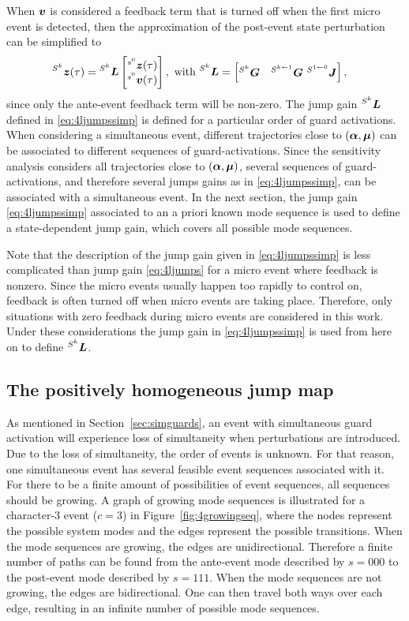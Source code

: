 \documentclass[../DC2017114Bouma.tex]{subfiles}
\begin{document}
When ${\boldsymbol{v}}$ is considered a feedback term that is turned off when the first micro event is detected, then the approximation of the post-event state perturbation can be simplified to
\begin{align}
\hspace{0cm}^{S^k}{\boldsymbol{z}}(\tau) &= \hspace{0cm}^{S^k}{\boldsymbol{L}} \begin{bmatrix}
\hspace{0cm}^{s^0}{\boldsymbol{z}}(\tau) \\ \hspace{0cm}^{s^0}{\boldsymbol{v}}(\tau)
\end{bmatrix}, \text{ with }\hspace{0cm}^{S^k}{\boldsymbol{L}} = \begin{bmatrix}
\hspace{0cm}^{S^k}{\boldsymbol{G}} & \hspace{0cm}^{S^{k\leftarrow 1}}{\boldsymbol{G}}\ \hspace{0cm}^{S^{1\leftarrow 0}}{\boldsymbol{J}}
\end{bmatrix},\label{eq:4ljumpssimp}
\end{align}
since only the ante-event feedback term will be non-zero. The jump gain $\hspace{0cm}^{S^k}{\boldsymbol{L}}$ defined in \eqref{eq:4ljumpssimp} is defined for a particular order of guard activations. When considering a simultaneous event, different trajectories close to $(\boldsymbol{\alpha},\boldsymbol{\mu})$ can be associated to different sequences of guard-activations. Since the sensitivity analysis considers all trajectories close to $(\boldsymbol{\alpha},\boldsymbol{\mu})$, several sequences of guard-activations, and therefore several jumps gains as in \eqref{eq:4ljumpssimp}, can be associated with a simultaneous event. In the next section, the jump gain \eqref{eq:4ljumpssimp} associated to an a priori known mode sequence is used to define a state-dependent jump gain, which covers all possible mode sequences. 

Note that the description of the jump gain given in \eqref{eq:4ljumpssimp} is less complicated than jump gain \eqref{eq:4ljumps} for a micro event where feedback is nonzero. Since the micro events usually happen too rapidly to control on, feedback is often turned off when micro events are taking place. Therefore, only situations with zero feedback during micro events are considered in this work. Under these considerations the jump gain in \eqref{eq:4ljumpssimp} is used from here on to define $\hspace{0cm}^{S^k}{\boldsymbol{L}}$.

\subsection{The positively homogeneous jump map}
As mentioned in Section~\ref{sec:simguards}, an event with simultaneous guard activation will experience loss of simultaneity when perturbations are introduced. Due to the loss of simultaneity, the order of events is unknown. For that reason, one simultaneous event has several feasible event sequences associated with it. For there to be a finite amount of possibilities of event sequences, all sequences should be growing. A graph of growing mode sequences is illustrated for a character-3 event ($c=3$) in Figure~\ref{fig:4growingseq}, where the nodes represent the possible system modes and the edges represent the possible transitions. When the mode sequences are growing, the edges are unidirectional. Therefore a finite number of paths can be found from the ante-event mode described by $s = 000$ to the post-event mode described by $s = 111$. When the mode sequences are not growing, the edges are bidirectional. One can then travel both ways over each edge, resulting in an infinite number of possible mode sequences.
\end{document}
